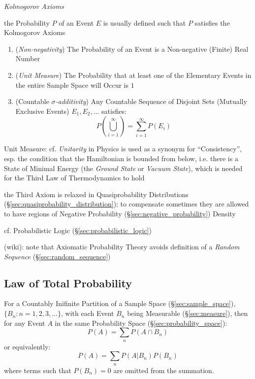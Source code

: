 \emph{Kolmogorov Axioms}

the Probability $P$ of an Event $E$ is usually defined such that $P$ satisfies
the Kolmogorov Axioms

\begin{enumerate}
  \item (\emph{Non-negativity}) The Probability of an Event is a Non-negative
    (Finite) Real Number
  \item (\emph{Unit Measure}) The Probability that at least one of the
    Elementary Events in the entire Sample Space will Occur is $1$
  \item (Countable \emph{$\sigma$-additivity}) Any Countable Sequence of
    Disjoint Sets (Mutually Exclusive Events) $E_1, E_2, \ldots$ satisfies:
    \[
      P (\bigcup_{i=1}^\infty) = \sum_{i=1}^\infty P(E_i)
    \]
\end{enumerate}

\fist Unit Measure: cf. \emph{Unitarity} in Physics is used as a synonym for
``Consistency'', esp. the condition that the Hamiltonian is bounded from below,
i.e. there is a State of Minimal Energy (the \emph{Ground State} or
\emph{Vacuum State}), which is needed for the Third Law of Thermodynamics to
hold

the Third Axiom is relaxed in Quasiprobability Distributions
(\S\ref{sec:quasiprobability_distribution}); to compensate sometimes they are
allowed to have regions of Negative Probability
(\S\ref{sec:negative_probability}) Density

\fist cf. Probabilistic Logic (\S\ref{sec:probabilistic_logic})

(wiki): note that Axiomatic Probability Theory avoids definition of a
\emph{Random Sequence} (\S\ref{sec:random_sequence})



\subsection{Law of Total Probability}\label{sec:total_probability}

For a Countably Inifinite Partition of a Sample Space
(\S\ref{sec:sample_space}), $\{ B_n : n = 1,2,3,\ldots \}$, with each Event
$B_n$ being Measurable (\S\ref{sec:measure}), then for any Event $A$ in the same
Probability Space (\S\ref{sec:probability_space}):
\[
  P(A) = \sum_n P(A \cap B_n)
\]
or equivalently:
\[
  P(A) = \sum_n P(A|B_n) P(B_n)
\]
where terms such that $P(B_n) = 0$ are omitted from the summation.



